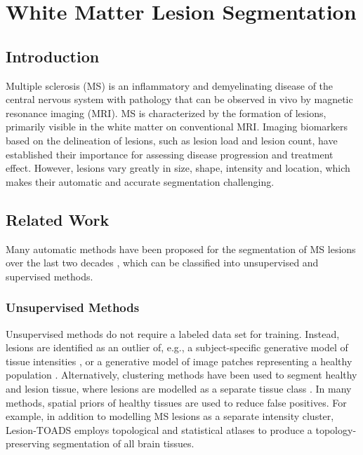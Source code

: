 \chapter{White Matter Lesion Segmentation}
\label{sec:segmentation}

\section{Introduction}

Multiple sclerosis (MS) is an inflammatory and demyelinating disease of the
central nervous system with pathology that can be observed in vivo by magnetic
resonance imaging (MRI). MS is characterized by the formation of lesions,
primarily visible in the white matter on conventional MRI. Imaging biomarkers
based on the delineation of lesions, such as lesion load and lesion count, have
established their importance for assessing disease progression and treatment
effect. However, lesions vary greatly in size, shape, intensity and location,
which makes their automatic and accurate segmentation challenging.

\section[Related work]{Related Work}

Many automatic methods have been proposed for the segmentation of MS
\mbox{lesions} over the last two decades \citep{garcia2013}, which can be
classified into unsupervised and supervised methods.

\subsection[Unsupervised methods]{Unsupervised Methods}

Unsupervised methods do not require a labeled data set for training. Instead,
lesions are identified as an outlier of, e.g., a subject-specific generative
model of tissue intensities
\citep{vanleemput2001,tomas2015,schmidt2012automated,roura2015}, or a generative
model of image patches representing a healthy population \citep{weiss2013}.
Alternatively, clustering methods have been used to segment healthy and lesion
tissue, where lesions are modelled as a separate tissue class
\citep{shiee2010topology,sudre2015}. In many methods, spatial priors of healthy
tissues are used to reduce false positives. For example, in addition to
modelling MS lesions as a separate intensity cluster, Lesion-TOADS
\citep{shiee2010topology} employs topological and statistical atlases to produce
a topology-preserving segmentation of all brain tissues.

